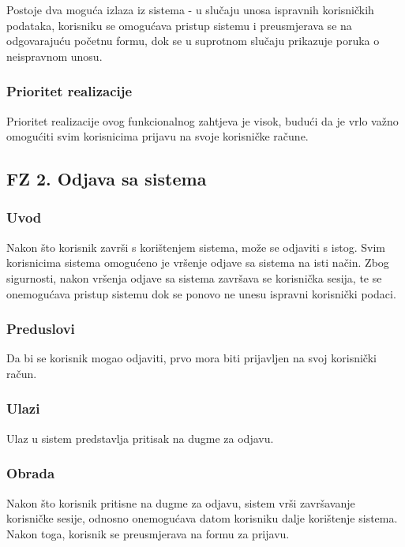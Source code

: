 \documentclass[12pt,a4paper]{article}
\begin{document}
Postoje dva moguća izlaza iz sistema - u slučaju unosa ispravnih korisničkih podataka, korisniku se omogućava pristup sistemu i preusmjerava se na odgovarajuću početnu formu, dok se u suprotnom slučaju prikazuje poruka o neispravnom unosu.

\subsubsection{Prioritet realizacije}

Prioritet realizacije ovog funkcionalnog zahtjeva je visok, budući da je vrlo važno omogućiti svim korisnicima prijavu na svoje korisničke račune.

\newpage

\subsection{FZ 2. Odjava sa sistema}

\subsubsection{Uvod}

Nakon što korisnik završi s korištenjem sistema, može se odjaviti s istog. Svim korisnicima sistema omogućeno je vršenje odjave sa sistema na isti način. Zbog sigurnosti, nakon vršenja odjave sa sistema završava se korisnička sesija, te se onemogućava pristup sistemu dok se ponovo ne unesu ispravni korisnički podaci.

\subsubsection{Preduslovi}

Da bi se korisnik mogao odjaviti, prvo mora biti prijavljen na svoj korisnički račun.

\subsubsection{Ulazi}

Ulaz u sistem predstavlja pritisak na dugme za odjavu.

\subsubsection{Obrada}

Nakon što korisnik pritisne na dugme za odjavu, sistem vrši završavanje korisničke sesije, odnosno onemogućava datom korisniku dalje korištenje sistema. Nakon toga, korisnik se preusmjerava na formu za prijavu.
\end{document}
